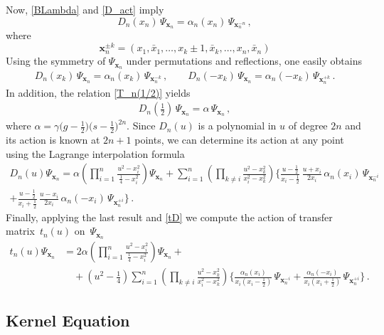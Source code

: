 \documentclass[a4paper,11pt]{article}
\numberwithin{equation}{section}
\begin{document}
Now, \eqref{BLambda} and \eqref{D_act} imply 
\begin{equation*}
    D_n(x_n)\,\Psi_{\bm{x}_n} = \alpha_n(x_n)\,\Psi_{\bm{x}_n^{-n}} \,,
\end{equation*} 
where
\begin{equation} \label{x_shift}
	\bm{x}_n^{\pm k} = (x_{1},\bar{x}_{1}, \ldots, x_k \pm 1, \bar{x}_k, \ldots, x_{n},\bar{x}_{n})
\end{equation}
Using the symmetry of $\Psi_{\bm{x}_n}$ under permutations and reflections, one easily obtains
\begin{align*}
    D_n(x_k)\,\Psi_{\bm{x}_n} = \alpha_n(x_k)\,\Psi_{\bm{x}_n^{-k}} \,, \qquad D_n(-x_k)\,\Psi_{\bm{x}_n} = \alpha_n(-x_k)\,\Psi_{\bm{x}_n^{+k}} \,.
\end{align*}    
In addition, the relation \eqref{T_n(1/2)} yields
\begin{align*}
    D_n\left(\tfrac{1}{2}\right)\,\Psi_{\bm{x}_n} = \alpha \, \Psi_{\bm{x}_n} \,,
\end{align*}    
where $\alpha = \gamma\bigl(g-\frac{1}{2}\bigr)\bigl(s-\frac{1}{2}\bigr)^{2n}$. Since $D_n(u)$ is a polynomial in $u$ of degree $2n$ and its action is known at $2n+1$ points, we can determine its action at any point using the Lagrange interpolation formula
\begin{multline*}
D_n(u)\Psi_{\bm{x}_n} 
= \alpha\left(\prod_{i=1}^{n}\frac{u^2-x_i^2}{\frac{1}{4}-x_i^2}\right)\Psi_{\bm{x}_n}
+ \sum_{i=1}^{n}\left(\prod_{k \neq i}\frac{u^2-x_k^2}{x_i^2-x_k^2}\right)\Biggl\{ 
\frac{u-\frac{1}{2}}{x_i-\frac{1}{2}}\,\frac{u+x_i}{2x_i}\,\alpha_n(x_i)\,\Psi_{\bm{x}_n^{-i}} \\
+ \frac{u-\frac{1}{2}}{x_i+\frac{1}{2}}\,\frac{u-x_i}{2x_i}\,\alpha_n(-x_i)\,\Psi_{\bm{x}_n^{+i}} 
\Biggr\} \,.
\end{multline*}
Finally, applying the last result and \eqref{tD} we compute the action of transfer matrix~$t_n(u)$ on~$\Psi_{\bm{x}_n}$
\begin{align}
\nonumber
t_n(u)\Psi_{\bm{x}_n} 
&= 2\alpha\left(\prod_{i=1}^{n}\frac{u^2-x_i^2}{\frac{1}{4}-x_i^2}\right)\Psi_{\bm{x}_n} + \\
\nonumber
&\quad + \left(u^2-\tfrac{1}{4}\right)\sum_{i=1}^{n}\left(\prod_{k \neq i}\frac{u^2-x_k^2}{x_i^2-x_k^2}\right)\Biggl\{ 
\frac{\alpha_n(x_i)}{x_i(x_i-\frac{1}{2})}\,\Psi_{\bm{x}_n^{-i}} +  \frac{\alpha_n(-x_i)}{x_i(x_i+\frac{1}{2})}\,\Psi_{\bm{x}_n^{+i}} 
\Biggr\} \,.
\end{align}


\subsection{Kernel Equation}
\end{document}
